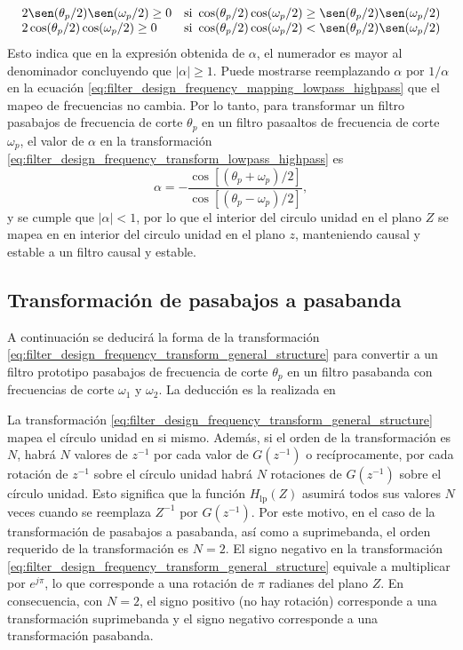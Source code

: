 \documentclass[a4paper]{report}
\begin{document}
\[
 \begin{array}{ll}
  2\sen(\theta_p/2)\sen(\omega_p/2)\geq0 & \textrm{si }\cos(\theta_p/2)\cos(\omega_p/2)\geq\sen(\theta_p/2)\sen(\omega_p/2)\\
  2\cos(\theta_p/2)\cos(\omega_p/2)\geq0 & \textrm{si }\cos(\theta_p/2)\cos(\omega_p/2)<\sen(\theta_p/2)\sen(\omega_p/2)
 \end{array}
\]
Esto indica que en la expresión obtenida de \(\alpha\), el numerador es mayor al denominador concluyendo que \(|\alpha|\geq1\). Puede mostrarse reemplazando \(\alpha\) por \(1/\alpha\) en la ecuación \ref{eq:filter_design_frequency_mapping_lowpass_highpass} que el mapeo de frecuencias no cambia. Por lo tanto, para transformar un filtro pasabajos de frecuencia de corte \(\theta_p\) en un filtro pasaaltos de frecuencia de corte \(\omega_p\), el valor de \(\alpha\) en la transformación \ref{eq:filter_design_frequency_transform_lowpass_highpass} es 
\begin{equation}\label{eq:filter_design_frequency_transform_alpha_lowpass_highpass}
 \alpha=-\frac{\cos[(\theta_p+\omega_p)/2]}{\cos[(\theta_p-\omega_p)/2]},
\end{equation}
y se cumple que \(|\alpha|<1\), por lo que el interior del circulo unidad en el plano \(Z\) se mapea en en interior del circulo unidad en el plano \(z\), manteniendo causal y estable a un filtro causal y estable.


\subsection{Transformación de pasabajos a pasabanda}

A continuación se deducirá la forma de la transformación \ref{eq:filter_design_frequency_transform_general_structure} para convertir a un filtro prototipo pasabajos de frecuencia de corte \(\theta_p\) en un filtro pasabanda con frecuencias de corte \(\omega_1\) y \(\omega_2\). La deducción es la realizada en \cite{constantinides1970spectral}

La transformación \ref{eq:filter_design_frequency_transform_general_structure} mapea el círculo unidad en si mismo. Además, si el orden de la transformación es \(N\), habrá \(N\) valores de \(z^{-1}\) por cada valor de \(G(z^{-1})\) o recíprocamente, por cada rotación de \(z^{-1}\) sobre el círculo unidad habrá \(N\) rotaciones de \(G(z^{-1})\) sobre el círculo unidad. Esto significa que la función \(H_\textrm{lp}(Z)\) asumirá todos sus valores \(N\) veces cuando se reemplaza \(Z^{-1}\) por \(G(z^{-1})\). Por este motivo, en el caso de la transformación de pasabajos a pasabanda, así como a suprimebanda, el orden requerido de la transformación es \(N=2\). El signo negativo en la transformación \ref{eq:filter_design_frequency_transform_general_structure} equivale a multiplicar por \(e^{j\pi}\), lo que corresponde a una rotación de \(\pi\) radianes del plano \(Z\). En consecuencia, con \(N=2\), el signo positivo (no hay rotación) corresponde a una transformación suprimebanda y el signo negativo corresponde a una transformación pasabanda.
 
\end{document}

